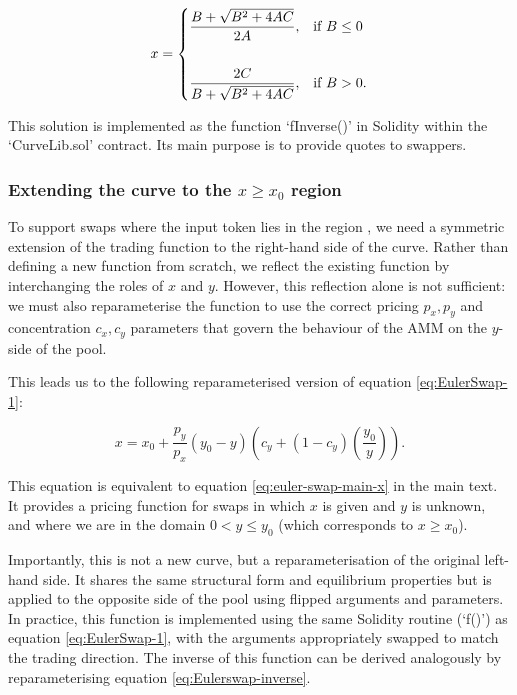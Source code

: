 \documentclass{article}
\begin{document}
\begin{align}
    \label{eq:Eulerswap-inverse}
    x =
    \begin{dcases}
    \frac{B + \sqrt{B^2 + 4AC}}{2A}, & \text{if } B \leq 0 \\\\
    \frac{2C}{B + \sqrt{B^2 + 4AC}}, & \text{if } B > 0.
    \end{dcases}
\end{align}

This solution is implemented as the function `fInverse()' in Solidity within the `CurveLib.sol' contract. Its main purpose is to provide quotes to swappers. 

\subsubsection{Extending the curve to the $x \geq x_0$ region}

To support swaps where the input token lies in the region , we need a symmetric extension of the trading function to the right-hand side of the curve. Rather than defining a new function from scratch, we reflect the existing function by interchanging the roles of $x$ and $y$. However, this reflection alone is not sufficient: we must also reparameterise the function to use the correct pricing $p_x, p_y$ and concentration $c_x, c_y$ parameters that govern the behaviour of the AMM on the $y$-side of the pool.

This leads us to the following reparameterised version of equation \eqref{eq:EulerSwap-1}:

\begin{equation}
\label{eq:EulerSwap-2}
x = x_0 + \frac{p_y}{p_x} (y_0 - y) \left( c_y + (1 - c_y) \left(\frac{y_0}{y}\right) \right).
\end{equation}

This equation is equivalent to equation \eqref{eq:euler-swap-main-x} in the main text. It provides a pricing function for swaps in which $x$ is given and $y$ is unknown, and where we are in the domain $0 < y \leq y_0$ (which corresponds to $x \geq x_0$).

Importantly, this is not a new curve, but a reparameterisation of the original left-hand side. It shares the same structural form and equilibrium properties but is applied to the opposite side of the pool using flipped arguments and parameters. In practice, this function is implemented using the same Solidity routine (`f()') as equation \eqref{eq:EulerSwap-1}, with the arguments appropriately swapped to match the trading direction. The inverse of this function can be derived analogously by reparameterising equation \eqref{eq:Eulerswap-inverse}.
\end{document}
